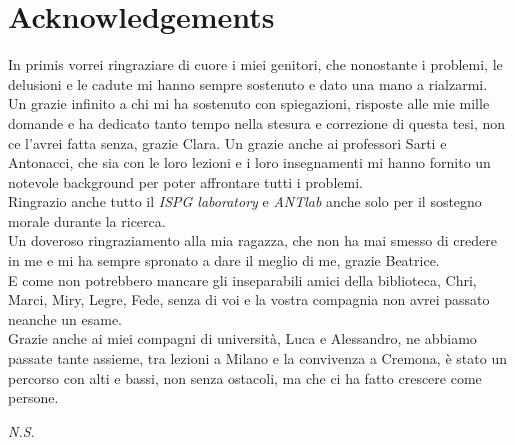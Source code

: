 \chapter{Acknowledgements}
\label{Acknowledgements}
\thispagestyle{empty}

\vspace{0.5cm}
In primis vorrei ringraziare di cuore i miei genitori, che nonostante i problemi, le delusioni e le cadute mi hanno sempre sostenuto e dato una mano a rialzarmi.
\\
Un grazie infinito a chi mi ha sostenuto con spiegazioni, risposte alle mie mille domande e ha dedicato tanto tempo nella stesura e correzione di questa tesi, non ce l'avrei fatta senza, grazie Clara. Un grazie anche ai professori Sarti e Antonacci, che sia con le loro lezioni e i loro insegnamenti mi hanno fornito un notevole background per poter affrontare tutti i problemi.
\\
Ringrazio anche tutto il \textit{ISPG laboratory} e \textit{ANTlab} anche solo per il sostegno morale durante la ricerca.
\\
Un doveroso ringraziamento alla mia ragazza, che non ha mai smesso di credere in me e mi ha sempre spronato a dare il meglio di me, grazie Beatrice.
\\
E come non potrebbero mancare gli inseparabili amici della biblioteca, Chri, Marci, Miry, Legre, Fede, senza di voi e la vostra compagnia non avrei passato neanche un esame.
\\
Grazie anche ai miei compagni di università, Luca e Alessandro, ne abbiamo passate tante assieme, tra lezioni a Milano e la convivenza a Cremona, è stato un percorso con alti e bassi, non senza ostacoli, ma che ci ha fatto crescere come persone.

\vspace{1cm}
\begin{flushright}
\textit{N.S.}
\end{flushright}